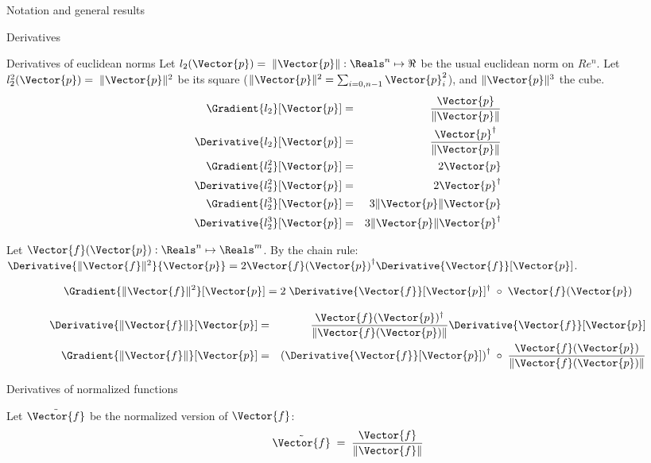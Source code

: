 \begin{plSection}{Notation and general results}
\begin{plSection}{Derivatives}
\begin{plSection}{Derivatives of euclidean norms}
Let $l_2(\Vector{p}) = \; \| \Vector{p}  \|: \Reals^n \mapsto \Re$ 
be the usual euclidean norm on $Re^n$.
Let $l_2^2(\Vector{p}) = \; \| \Vector{p}  \|^2 $
be its square
($ \| \Vector{p}  \|^2  = \sum_{i=0,n-1} \Vector{p}_i^2$),
and $ \| \Vector{p}  \|^3$ the cube.
\begin{eqnarray}
\label{eq:l2-gradient}
\Gradient{l_2}[\Vector{p}] 
& = & {{ \Vector{p} } \over { \| \Vector{p}  \|}} \\
\Derivative{l_2}[\Vector{p}]
 & = & {{ \Vector{p}^\dagger } \over { \| \Vector{p}  \|}} \nonumber \\
\Gradient{l_2^2}[\Vector{p}] & = & 2\Vector{p} \nonumber \\ 
\Derivative{l_2^2}[\Vector{p}] & = & 2\Vector{p}^\dagger \nonumber \\
\Gradient{l_2^3}[\Vector{p}] 
& = & 3 \| \Vector{p}  \| \Vector{p} \nonumber \\
\Derivative{l_2^3}[\Vector{p}] 
& = & 3 \| \Vector{p}  \| \Vector{p}^\dagger \nonumber
\end{eqnarray}

Let $\Vector{f}(\Vector{p}) : \Reals^n \mapsto \Reals^m$.
By the chain rule:
$\Derivative{\| \Vector{f} \|^2}{\Vector{p}}  
=  
2 {\Vector{f}(\Vector{p})}^{\dagger}
 \Derivative{\Vector{f}}[\Vector{p}] $.

\begin{equation}
\Gradient{\| \Vector{f} \|^2}[\Vector{p}]  = 
 2 \;\Derivative{\Vector{f}}[\Vector{p}]^\dagger 
 \;\circ \;\Vector{f}(\Vector{p})
\end{equation}

\begin{eqnarray}
\label{eq:norm_derivative}
\Derivative{\| \Vector{f} \|}[\Vector{p}]
& = &
{{\Vector{f}(\Vector{p})^\dagger} 
\over 
{\| \Vector{f}(\Vector{p}) \|}} 
\Derivative{\Vector{f}}[\Vector{p}]  \\
\Gradient{\| \Vector{f} \|}[\Vector{p}]
& = &
\left(\Derivative{\Vector{f}}[\Vector{p}]\right)^\dagger
 \;\circ \;{{\Vector{f}(\Vector{p})} 
 \over
  { \| \Vector{f}(\Vector{p})  \|}}
\label{eq:norm_gradient}
\end{eqnarray}

\end{plSection}%
\begin{plSection}{Derivatives of normalized functions}
\label{sec:Derivatives-of-normalized-functions}

Let $\tilde{\Vector{f}}$ be the normalized version of $\Vector{f}$:
\begin{equation}
\tilde{\Vector{f}} \;= \;{{\Vector{f}} \over {\| \Vector{f} \|}}
\end{equation}


\end{plSection}
\end{plSection}
\end{plSection}
